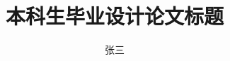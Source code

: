 \documentclass[degree=bachelor]{nwputhesis}
\title{本科生毕业设计论文标题}{Bachelor Thesis Title}
\author{张三}{San Zhang}
\begin{document}
\START
\showoutput

\maketitle

\clearpage
\OMIT
\end{document}
